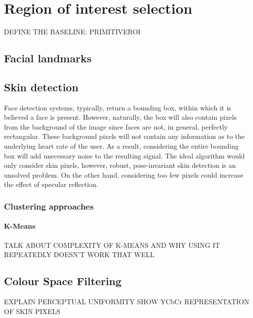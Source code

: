 \section{Region of interest selection}
DEFINE THE BASELINE: PRIMITIVEROI
\subsection{Facial landmarks}
\subsection{Skin detection}
Face detection systems, typically, return a bounding box, within which it is believed
a face is present. However, naturally, the box will also contain pixels from the background of 
the image since faces are not, in general, perfectly rectangular.
These background pixels will not contain any information as to the underlying heart rate of the user.
As a result, considering the entire bounding box will add unecessary noise to the resulting signal.
The ideal algorithm would only consider skin pixels, however, robust, pose-invariant skin detection is an unsolved problem.
On the other hand, considering too few pixels could increase the effect of specular reflection.

\subsubsection{Clustering approaches}
\paragraph{K-Means}
TALK ABOUT COMPLEXITY OF K-MEANS AND WHY USING IT REPEATEDLY DOESN'T WORK THAT WELL

\subsection{Colour Space Filtering}
EXPLAIN PERCEPTUAL UNIFORMITY 
SHOW YCbCr REPRESENTATION OF SKIN PIXELS


